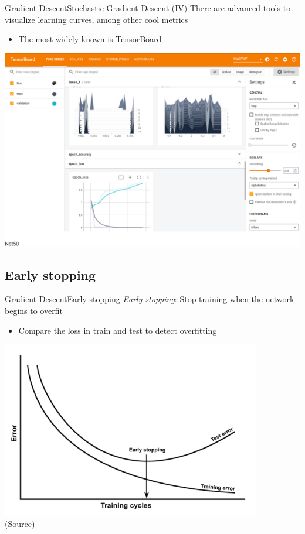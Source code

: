 \documentclass[10pt,compress]{beamer} %
\begin{document}
\begin{frame}{Gradient Descent}{Stochastic Gradient Descent (IV)}
    There are advanced tools to visualize learning curves, among other cool metrics
    \begin{itemize}
        \item The most widely known is TensorBoard
    \end{itemize}

	\includegraphics[width=0.8\linewidth]{figs/tensorboard.png}
\end{frame}



\subsection{Early stopping}
\begin{frame}{Gradient Descent}{Early stopping}
	\textit{Early stopping}: Stop training when the network begins to overfit
            \begin{itemize}
                \item Compare the loss in train and test to detect overfitting
            \end{itemize}

            \begin{center}
			\includegraphics[width=0.6\linewidth]{figs/validation.png}\\
			\scriptsize \href{https://datascience.stackexchange.com/questions/61/why-is-overfitting-bad-in-machine-learning}{(Source)}
            \end{center}
\end{frame}
\end{document}
